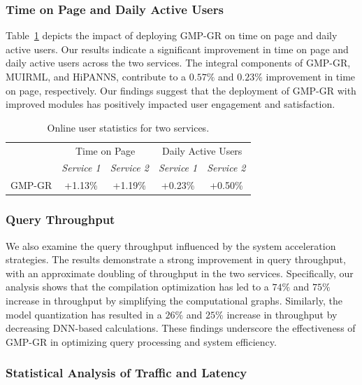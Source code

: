 \subsubsection{Time on Page and Daily Active Users}

Table~\ref{gmpgr:tab:user_exp} depicts the impact of deploying GMP-GR on time on page and daily active users. Our results indicate a significant improvement in time on page and daily active users across the two services.
The integral components of GMP-GR, MUIRML, and HiPANNS, contribute to a $0.57\%$ and $0.23\%$ improvement in time on page, respectively.
Our findings suggest that the deployment of GMP-GR with improved modules has positively impacted user engagement and satisfaction.

\begin{table}[t]
    \caption{Online user statistics for two services.}
    \label{gmpgr:tab:user_exp}
    \centering
    \begin{tabular}{c|cc|cc}
        \toprule
        & \multicolumn{2}{c|}{Time on Page} & \multicolumn{2}{c}{Daily Active Users} \\
        & \textit{Service 1} & \textit{Service 2} & \textit{Service 1} & \textit{Service 2} \\
        \midrule
        GMP-GR & +1.13\% & +1.19\% & +0.23\% & +0.50\% \\
        \bottomrule
    \end{tabular}
\end{table}

\subsubsection{Query Throughput}
We also examine the query throughput influenced by the system acceleration strategies. The results demonstrate a strong improvement in query throughput, with an approximate doubling of throughput in the two services. Specifically, our analysis shows that the compilation optimization has led to a $74\%$ and $75\%$ increase in throughput by simplifying the computational graphs. Similarly, the model quantization has resulted in a $26\%$ and $25\%$ increase in throughput by decreasing DNN-based calculations. These findings underscore the effectiveness of GMP-GR in optimizing query processing and system efficiency.

\subsubsection{Statistical Analysis of Traffic and Latency}

